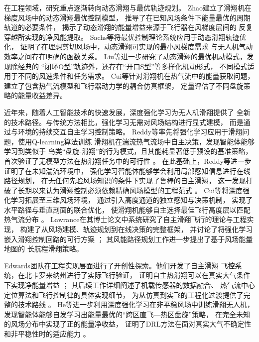 在工程领域，研究重点逐渐转向动态滑翔与最优轨迹规划。
Zhao建立了滑翔机在梯度风场中的动态滑翔最优控制模型，
推导了在已知风场条件下能量最优的周期轨道的必要条件，
揭示了动态滑翔的能量增益来源于飞行器在风梯度层间的
反复穿越所实现的净风能提取\cite{zhaoOptimalPatternsGlider2004}。
Sachs等将最优控制理论系统应用于动态滑翔轨迹优化，
证明了在理想剪切风场中，动态滑翔可实现的最小风梯度需求
与无人机气动效率之间存在明确的函数关系\cite{sachsApplicationOptimalControl2005a}。
Liu等进一步研究了动态滑翔的最优机动模式，发现除经典的
“闭环O型”轨迹外，还存在“开口S型”等多样化机动形式，
不同模式适用于不同的风速条件和任务需求\cite{liuOptimalPatternsDynamic2017}。
Cui等针对滑翔机在热气流中的能量获取问题，
建立了包含热气流模型和飞行器动力学的耦合仿真框架，
定量评估了不同盘旋策略的能量收益差异\cite{cuiStudyGliderSoaring2023}。

近年来，随着人工智能技术的快速发展，深度强化学习为无人机滑翔提供了
全新的技术路径。与传统方法相比，强化学习无需对风场结构进行显式建模，
而是通过与环境的持续交互自主学习控制策略。
Reddy等率先将强化学习应用于滑翔问题，使用Q-learning算法训练
滑翔机在湍流热气流场中自主决策，发现智能体能够学习到类似于
鸟类“盘旋-滑翔”的行为模式，且其能耗显著低于预设的基准策略，
首次验证了无模型方法在热滑翔任务中的可行性
\cite{reddyGliderSoaringReinforcement2018}。
在此基础上，Reddy等进一步证明了在未知湍流环境中，
强化学习智能体能够学会利用局部感知信息进行在线路径规划，
在无任何先验风场知识的条件下实现了鲁棒的自主滑翔，
这一发现打破了长期以来认为滑翔控制必须依赖精确风场模型的工程范式
\cite{reddyLearningSoarTurbulent2016}。
Cui等将深度强化学习拓展至三维风场环境，
通过引入高度通道的独立感知与决策机制，
实现了水平路径与垂直剖面的联合优化，
使滑翔机能够自主选择最佳飞行高度层以匹配热气流分布
\cite{cuiStudyGliderSoaring2023}。
Lawrance在其博士论文中系统研究了自主滑翔飞行的理论与工程实现，
构建了从风场建模、轨迹规划到在线决策的完整框架，
并讨论了将强化学习嵌入滑翔控制回路的可行方案
\cite{lawranceAutonomousSoaringFlight2011}；
其风能路径规划工作进一步提出了基于风场能量地图的
长航程滑翔策略\cite{lawranceWindEnergyBased2009}。

Edwards团队在工程实现层面进行了开创性探索。他们开发了自主滑翔
飞控系统，在北卡罗来纳州进行了实际飞行验证，
证明自主热滑翔可以在真实大气条件下实现净能量增益
\cite{edwardsAutonomousSoaringMontague2010}；
其后续工作详细阐述了机载传感器的数据融合、
热气流中心定位算法和飞行控制律的具体实现细节，
为从仿真到实飞的工程化过渡提供了完整的技术路线
\cite{edwardsImplementationDetailsFlight2008}。
He等进一步利用深度强化学习在非平稳风场中训练滑翔无人机，
发现智能体能够自发学习出能量最优的“跨区直飞—热区盘旋”策略，
在完全未知的风场分布中实现了正的能量净收益，
证明了DRL方法在面对真实大气不确定性和非平稳性时的适应能力
\cite{heEnergypositiveSoaringUsing2024}。

